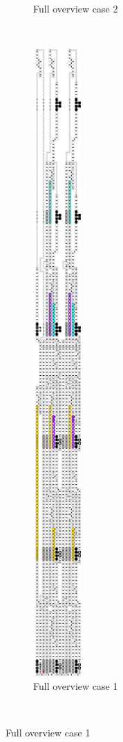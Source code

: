 \begin{figure}[H]
\begin{subfigure}[t]{0.2\textwidth}
                \caption{\label{fig:full_overview_case2_colored} Full overview case 2}
            \end{subfigure}%
            ~
            \begin{subfigure}[t]{0.2\textwidth}
                \centering
                \includegraphics[width=0.2\textwidth]{full_overview_case1_colored}
                \caption{\label{fig:full_overview_case1_colored} Full overview case 1}
            \end{subfigure}%
            ~
        \end{figure}